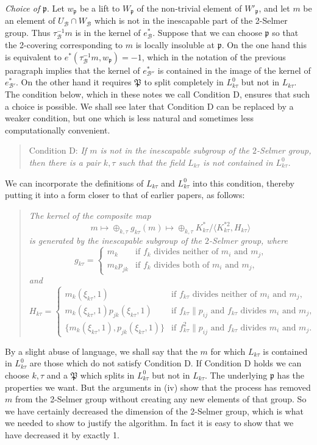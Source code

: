 \documentclass[12pt]{article}
\def\fp{{\mathfrak p}}
\def\fP{{\mathfrak P}}
\def\sB{{\mathcal B}}
\begin{document}
\noindent \emph{Choice of} $\fp$. Let $w_\fp$ be a lift to
$W_\fp$ of the non-trivial element of $W'_\fp$, and let $m$ be
an element of $U_\sB\cap W_\sB$ which is not in the
inescapable part of the 2-Selmer group. Thus $\tau^{-1}_\sB m$
is in the kernel of $e^*_\sB$. Suppose that we can choose
$\fp$ so that the 2-covering corresponding to $m$ is locally
insoluble at $\fp$. On the one hand this is equivalent to
$e^*(\tau^{-1}_\sB m,w_\fp)=-1$, which in the notation of the
previous paragraph implies that the kernel of $e^*_{\sB''}$ is
contained in the image of the kernel of $e^*_{\sB'}$. On the
other hand it requires
$\fP$ to split completely in $L^0_{k\tau}$ but not in
$L_{k\tau}$. The condition
below, which in these notes we call Condition D,
ensures that such a choice is possible.
We shall see later that Condition D can be replaced by a
weaker condition, but one which is less natural and sometimes
less computationally convenient.
\begin{quote}
Condition D: \emph{If $m$ is not in the inescapable subgroup
of the $2$-Selmer group, then
there is a pair $k,\tau$ such that the field $L_{k\tau}$ is
not contained in $L^0_{k\tau}$.}
\end{quote}
We can incorporate the definitions of $L_{k\tau}$ and
$L^0_{k\tau}$ into this condition, thereby putting it into a
form closer to that of earlier papers, as follows:
\begin{quote}
\emph{The kernel of the composite map
\[ m\mapsto\oplus_{k,\tau}g_{k\tau}(m)\mapsto\oplus_{k,\tau}
K^*_{k\tau}/\langle K^{*2}_{k\tau},H_{k\tau}\rangle \]
is generated by the inescapable subgroup of the $2$-Selmer group,
where
\[ g_{k\tau}=\begin{cases}
m_k & \text{if $f_k$ divides neither of $m_i$ and $m_j$,} \\
m_kp_{jk} & \text {if $f_k$ divides both of $m_i$ and $m_j$,}
\end{cases} \]
and
\[ H_{k\tau}=\begin{cases}
m_k(\xi_{k\tau},1) & \text{if $f_{k\tau}$ divides neither of $m_i$ and $m_j$,} \\
m_k(\xi_{k\tau},1)p_{jk}(\xi_{k\tau},1) & \text{if $f_{k\tau}\|p_{ij}$ and $f_{k\tau}$ divides $m_i$ and $m_j$,} \\
\{m_k(\xi_{k\tau},1),p_{jk}(\xi_{k\tau},1)\} & \text{if $f_{k\tau}^2\|p_{ij}$ and $f_{k\tau}$ divides $m_i$ and $m_j$.}
\end{cases} \]
} \end{quote}
By a slight abuse of language, we shall say that the $m$ for
which $L_{k\tau}$ is contained in $L^0_{k\tau}$ are those
which do not satisfy Condition D.
If Condition D holds we can choose $k,\tau$ and a $\fP$ which
splits in $L^0_{k\tau}$ but not in $L_{k\tau}$. The underlying
$\fp$ has the properties we want. But the arguments in (iv)
show that the process has removed $m$ from the 2-Selmer group
without creating any new elements of that group. So we have
certainly decreased the dimension of the 2-Selmer group,
which is what we needed to show to justify the algorithm. In
fact it is easy to show that we have decreased it by exactly 1.
\end{document}
